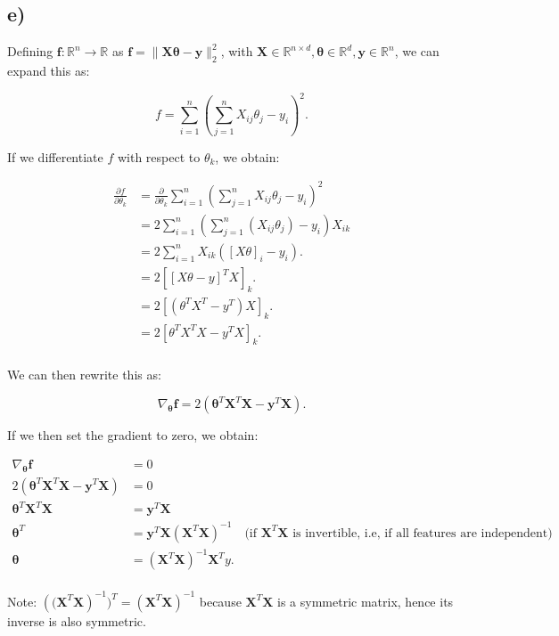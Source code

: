 \documentclass[12pt,a4paper,oneside]{paper}
\begin{document}
\newpage
\subsection*{e)}

Defining $\bm{f}: \mathbb{R}^{n} \rightarrow \mathbb{R}$ as $\bm{f} = \| \bm{X} \bm{\theta} - \bm{y} \|_2^2 $, with $\bm{X} \in \mathbb{R}^{n\times d}, \bm{\theta}  \in \mathbb{R}^{d}, \bm{y}  \in \mathbb{R}^{n} $, we can expand this as:

\[
f = \sum_{i=1}^{n} \left( \sum_{j=1}^{n} X_{ij} \theta_j - y_i \right)^2.
\]

If we differentiate \( f \) with respect to \( \theta_k \), we obtain:

\begin{align*}
\frac{\partial f}{\partial \theta_k} &= \frac{\partial}{\partial \theta_k} \sum_{i=1}^{n} \left( \sum_{j=1}^{n} X_{ij} \theta_j - y_i \right)^2 \\
&= 2 \sum_{i=1}^{n} \left( \sum_{j=1}^{n} \left(X_{ij} \theta_j\right) - y_i \right) X_{ik} \\
&= 2 \sum_{i=1}^{n} X_{ik} \left([ X \theta]_i  - y_i\right). \\
&= 2 [[X \theta  - y ]^T X]_k. \\
&= 2 [(\theta^T X^T - y^T) X]_k. \\
&= 2 [\theta^T X^T X - y^T X]_k. \\
\end{align*}

We can then rewrite this as:

\[
\nabla_{\bm{\theta}} \bm{f} = 2 (\bm{\theta}^T \bm{X}^T \bm{X} - \bm{y}^T \bm{X}).
\]


If we then set the gradient to zero, we obtain:

\begin{align*}
\nabla_{\bm{\theta}} \bm{f} &= 0 \\
2 (\bm{\theta}^T \bm{X}^T \bm{X} - \bm{y}^T \bm{X}) &= 0 \\
\bm{\theta}^T \bm{X}^T \bm{X} &= \bm{y}^T \bm{X} \\
\bm{\theta}^T &= \bm{y}^T \bm{X} (\bm{X}^T \bm{X})^{-1} \quad \text{(if } \bm{X}^T \bm{X} \text{ is invertible, i.e, if all features are independent)} \\
\bm{\theta} &= (\bm{X}^T \bm{X})^{-1} \bm{X}^T y. \\
\end{align*}

Note: $\left((\bm{X}^T \bm{X}\right)^{-1})^T = (\bm{X}^T \bm{X})^{-1}$ because $\bm{X}^T \bm{X}$ is a symmetric matrix, hence its inverse is also symmetric. 
\end{document}
